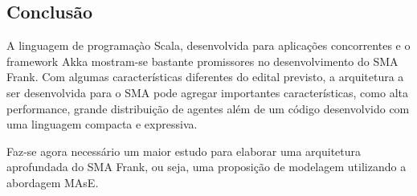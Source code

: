 \subsection{Conclusão}
A linguagem de programaçào Scala, desenvolvida para aplicações concorrentes e o framework Akka mostram-se bastante promissores no desenvolvimento do SMA Frank. Com algumas características diferentes do edital previsto, a arquitetura a ser desenvolvida para o SMA pode agregar importantes características, como alta performance, grande distribuição de agentes além de um código desenvolvido com uma linguagem compacta e expressiva.

Faz-se agora necessário um maior estudo para elaborar uma arquitetura aprofundada do SMA Frank, ou seja, uma proposição de modelagem utilizando a abordagem MAsE.



